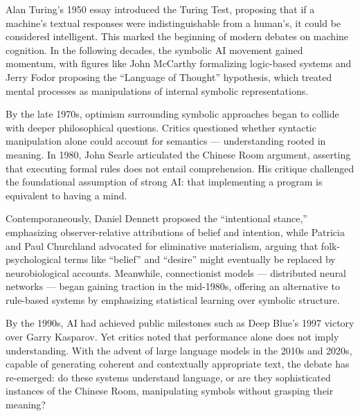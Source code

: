 \begin{historical}
Alan Turing’s 1950 essay introduced the Turing Test, proposing that if a machine’s textual responses were indistinguishable from a human’s, it could be considered intelligent. This marked the beginning of modern debates on machine cognition. In the following decades, the symbolic AI movement gained momentum, with figures like John McCarthy formalizing logic-based systems and Jerry Fodor proposing the “Language of Thought” hypothesis, which treated mental processes as manipulations of internal symbolic representations.

By the late 1970s, optimism surrounding symbolic approaches began to collide with deeper philosophical questions. Critics questioned whether syntactic manipulation alone could account for semantics — understanding rooted in meaning. In 1980, John Searle articulated the Chinese Room argument, asserting that executing formal rules does not entail comprehension. His critique challenged the foundational assumption of strong AI: that implementing a program is equivalent to having a mind.

Contemporaneously, Daniel Dennett proposed the “intentional stance,” emphasizing observer-relative attributions of belief and intention, while Patricia and Paul Churchland advocated for eliminative materialism, arguing that folk-psychological terms like “belief” and “desire” might eventually be replaced by neurobiological accounts. Meanwhile, connectionist models — distributed neural networks — began gaining traction in the mid-1980s, offering an alternative to rule-based systems by emphasizing statistical learning over symbolic structure.

By the 1990s, AI had achieved public milestones such as Deep Blue’s 1997 victory over Garry Kasparov. Yet critics noted that performance alone does not imply understanding. With the advent of large language models in the 2010s and 2020s, capable of generating coherent and contextually appropriate text, the debate has re-emerged: do these systems understand language, or are they sophisticated instances of the Chinese Room, manipulating symbols without grasping their meaning?
\end{historical}
